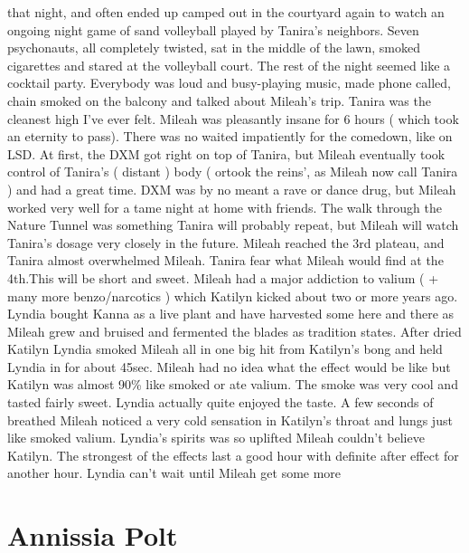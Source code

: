 \documentclass[12pt]{book}
\begin{document}
that night, and often ended up camped out in the courtyard again to watch an ongoing night game of sand volleyball played by Tanira's neighbors. Seven psychonauts, all completely twisted, sat in the middle of the lawn, smoked cigarettes and stared at the volleyball court. The rest of the night seemed like a cocktail party. Everybody was loud and busy-playing music, made phone called, chain smoked on the balcony and talked about Mileah's trip. Tanira was the cleanest high I've ever felt. Mileah was pleasantly insane for 6 hours ( which took an eternity to pass). There was no waited impatiently for the comedown, like on LSD. At first, the DXM got right on top of Tanira, but Mileah eventually took control of Tanira's ( distant ) body ( ortook the reins', as Mileah now call Tanira ) and had a great time. DXM was by no meant a rave or dance drug, but Mileah worked very well for a tame night at home with friends. The walk through the Nature Tunnel was something Tanira will probably repeat, but Mileah will watch Tanira's dosage very closely in the future. Mileah reached the 3rd plateau, and Tanira almost overwhelmed Mileah. Tanira fear what Mileah would find at the 4th.This will be short and sweet. Mileah had a major addiction to valium ( + many more benzo/narcotics ) which Katilyn kicked about two or more years ago. Lyndia bought Kanna as a live plant and have harvested some here and there as Mileah grew and bruised and fermented the blades as tradition states. After dried Katilyn Lyndia smoked Mileah all in one big hit from Katilyn's bong and held Lyndia in for about 45sec. Mileah had no idea what the effect would be like but Katilyn was almost 90\% like smoked or ate valium. The smoke was very cool and tasted fairly sweet. Lyndia actually quite enjoyed the taste. A few seconds of breathed Mileah noticed a very cold sensation in Katilyn's throat and lungs just like smoked valium. Lyndia's spirits was so uplifted Mileah couldn't believe Katilyn. The strongest of the effects last a good hour with definite after effect for another hour. Lyndia can't wait until Mileah get some more



\chapter{Annissia Polt}
\end{document}
